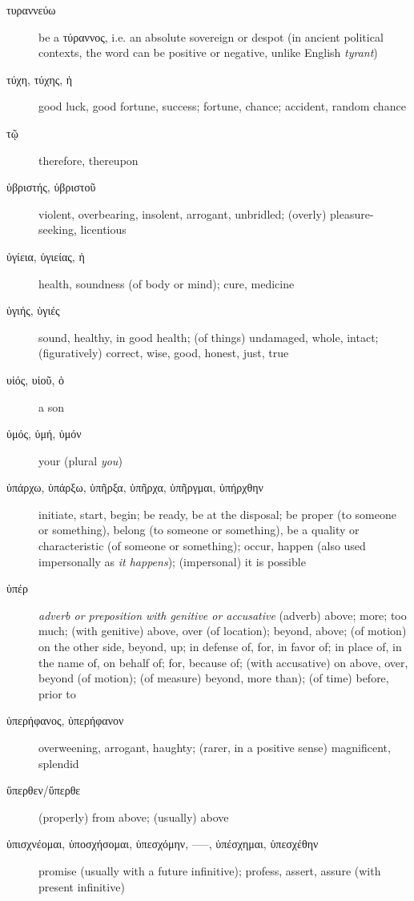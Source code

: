 \documentclass[12pt,letterpaper]{article}
\begin{document}
\begin{description}
    \item[\textgreek{τυραννεύω}] be a \textgreek{τύραννος}, i.e. an absolute sovereign or despot (in ancient political contexts, the word can be positive or negative, unlike English \textit{tyrant})
    \item[\textgreek{τύχη, τύχης, ἡ}] \marginnote{*}good luck, good fortune, success; fortune, chance; accident, random chance
    \item[\textgreek{τῷ}] therefore, thereupon
    \item[\textgreek{ὑβριστής, ὑβριστοῦ}] violent, overbearing, insolent, arrogant, unbridled; (overly) pleasure-seeking, licentious
    \item[\textgreek{ὑγίεια, ὑγιείας, ἡ}] health, soundness (of body or mind); cure, medicine
    \item[\textgreek{ὑγιής, ὑγιές}] sound, healthy, in good health; (of things) undamaged, whole, intact; (figuratively) correct, wise, good, honest, just, true
    \item[\textgreek{υἱός, υἱοῦ, ὁ}] \marginnote{*}a son
    \item[\textgreek{ὑμός, ὑμή, ὑμόν}] your (plural \textit{you})
    \item[\textgreek{ὑπάρχω, ὑπάρξω, ὑπῆρξα, ὑπῆρχα, ὑπῆργμαι, ὑπήρχθην}] \marginnote{*}initiate, start, begin; be ready, be at the disposal; be proper (to someone or something), belong (to someone or something), be a quality or characteristic (of someone or something); occur, happen (also used impersonally as \textit{it happens}); (impersonal) it is possible
    \item[\textgreek{ὑπέρ}] \marginnote{*}\textit{adverb or preposition with genitive or accusative} (adverb) above; more; too much; (with genitive) above, over (of location); beyond, above; (of motion) on the other side, beyond, up; in defense of, for, in favor of; in place of, in the name of, on behalf of; for, because of; (with accusative) on above, over, beyond (of motion); (of measure) beyond, more than); (of time) before, prior to
    \item[\textgreek{ὑπερήφανος, ὑπερήφανον}] overweening, arrogant, haughty; (rarer, in a positive sense) magnificent, splendid
    \item[\textgreek{ὕπερθεν/ὕπερθε}] (properly) from above; (usually) above
    \item[\textgreek{ὑπισχνέομαι, ὑποσχήσομαι, ὑπεσχόμην, –––, ὑπέσχημαι, ὑπεσχέθην}] promise (usually with a future infinitive); profess, assert, assure (with present infinitive)

\end{description}
\end{document}
